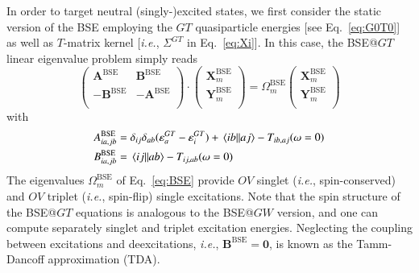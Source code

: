 \documentclass[aip,jcp,reprint,noshowkeys,superscriptaddress]{revtex4-1}
\newcommand{\ie}{\textit{i.e.}}
\newcommand{\Nocc}{O}
\newcommand{\Nvir}{V}
\newcommand{\BSE}{\text{BSE}}
\newcommand{\GT}{GT}
\newcommand{\e}[2]{\eps_{#1}^{#2}}
\newcommand{\Om}[2]{\Omega_{#1}^{#2}}
\newcommand{\bO}{\mathbf{0}}
\newcommand{\bA}[2]{\mathbf{A}_{#1}^{#2}}
\newcommand{\bB}[2]{\mathbf{B}_{#1}^{#2}}
\newcommand{\bX}[2]{\mathbf{X}_{#1}^{#2}}
\newcommand{\bY}[2]{\mathbf{Y}_{#1}^{#2}}
\newcommand{\eps}{\varepsilon}
\begin{document}
In order to target neutral (singly-)excited states, we first consider the static version of the BSE employing the $GT$ quasiparticle energies [see Eq.~\eqref{eq:G0T0}] as well as $T$-matrix kernel [\ie, $\Sigma^{\GT}$ in Eq.~\eqref{eq:Xi}].
In this case, the BSE@$GT$ linear eigenvalue problem simply reads
\begin{equation}
\label{eq:BSE}
	\begin{pmatrix}
		\bA{}{\BSE}		&	\bB{}{\BSE}	\\
		-\bB{}{\BSE}	&	-\bA{}{\BSE}	\\
	\end{pmatrix}
	\cdot
	\begin{pmatrix}
		\bX{m}{\BSE}	\\
		\bY{m}{\BSE}	\\
	\end{pmatrix}
	=
	\Om{m}{\BSE}
	\begin{pmatrix}
		\bX{m}{\BSE}	\\
		\bY{m}{\BSE}	\\
	\end{pmatrix}
\end{equation}
with 
\begin{subequations}
\begin{align}
	A_{ia,jb}^{\BSE} & = \delta_{ij} \delta_{ab} (\e{a}{\GT} - \e{i}{\GT}) + \mel{ib}{}{aj} - T_{ib,aj}(\omega=0)
	\\ 
	B_{ia,jb}^{\BSE} & = \mel{ij}{}{ab} - T_{ij,ab}(\omega=0)
\end{align}
\end{subequations}
The eigenvalues $\Om{m}{\BSE}$ of Eq.~\eqref{eq:BSE} provide $\Nocc\Nvir$ singlet (\ie, spin-conserved) and $\Nocc\Nvir$ triplet  (\ie, spin-flip) single excitations.
Note that the spin structure of the BSE@$GT$ equations is analogous to the BSE@$GW$ version, \cite{Monino_2021} and one can compute separately singlet and triplet excitation energies.
Neglecting the coupling between excitations and deexcitations, \ie, $\bB{}{\BSE} = \bO$, is known as the Tamm-Dancoff approximation (TDA).
\end{document}
